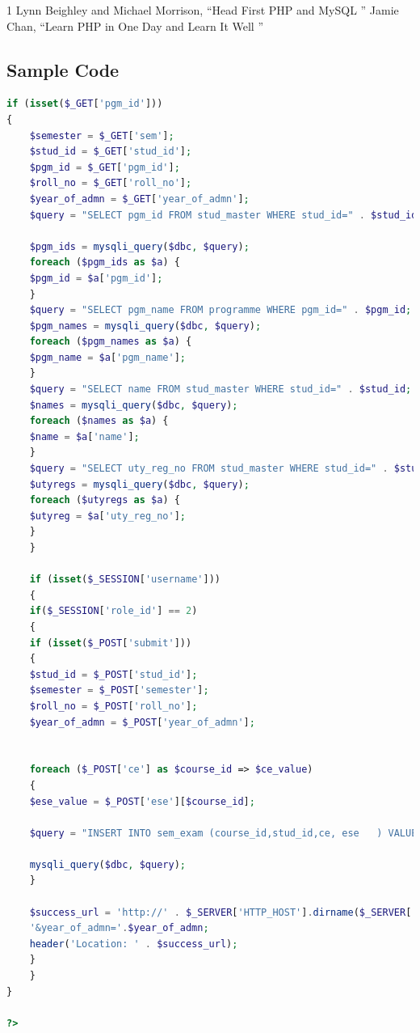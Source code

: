 \documentclass{nascproject}
\begin{document}
\begin{thebibliography}{1}
\bibitem{}  Lynn Beighley and Michael Morrison, ``Head First PHP and MySQL '' 
\bibitem {} Jamie Chan, ``Learn PHP in One Day and Learn It Well ''

\end{thebibliography}

\begin{appendices}
\chapter{Sample Code}
\begin{lstlisting}[language=php]
if (isset($_GET['pgm_id'])) 
{
	$semester = $_GET['sem'];
	$stud_id = $_GET['stud_id'];
	$pgm_id = $_GET['pgm_id'];
	$roll_no = $_GET['roll_no'];
	$year_of_admn = $_GET['year_of_admn'];
	$query = "SELECT pgm_id FROM stud_master WHERE stud_id=" . $stud_id;
	
	$pgm_ids = mysqli_query($dbc, $query);
	foreach ($pgm_ids as $a) {
	$pgm_id = $a['pgm_id'];
	}
	$query = "SELECT pgm_name FROM programme WHERE pgm_id=" . $pgm_id;
	$pgm_names = mysqli_query($dbc, $query);
	foreach ($pgm_names as $a) {
	$pgm_name = $a['pgm_name'];
	}
	$query = "SELECT name FROM stud_master WHERE stud_id=" . $stud_id;
	$names = mysqli_query($dbc, $query);
	foreach ($names as $a) {
	$name = $a['name'];
	}
	$query = "SELECT uty_reg_no FROM stud_master WHERE stud_id=" . $stud_id;
	$utyregs = mysqli_query($dbc, $query);
	foreach ($utyregs as $a) {
	$utyreg = $a['uty_reg_no'];
	}
	}
	
	if (isset($_SESSION['username'])) 
	{ 
	if($_SESSION['role_id'] == 2)
	{
	if (isset($_POST['submit']))  
	{
	$stud_id = $_POST['stud_id'];
	$semester = $_POST['semester'];
	$roll_no = $_POST['roll_no'];
	$year_of_admn = $_POST['year_of_admn'];
	
	
	foreach ($_POST['ce'] as $course_id => $ce_value) 
	{
	$ese_value = $_POST['ese'][$course_id];
	
	$query = "INSERT INTO sem_exam (course_id,stud_id,ce, ese   ) VALUES ('$course_id','$stud_id','$ce_value', '$ese_value')";
	
	mysqli_query($dbc, $query);
	}
	
	$success_url = 'http://' . $_SERVER['HTTP_HOST'].dirname($_SERVER['PHP_SELF']) . '/resultuploadsuccess.php?'.'stud_id='.$stud_id.'&roll_no='.$roll_no.'&sem='.$semester.
	'&year_of_admn='.$year_of_admn;
	header('Location: ' . $success_url);  
	} 
	}
}

?>

\end{lstlisting}
\end{appendices}
\end{document}
